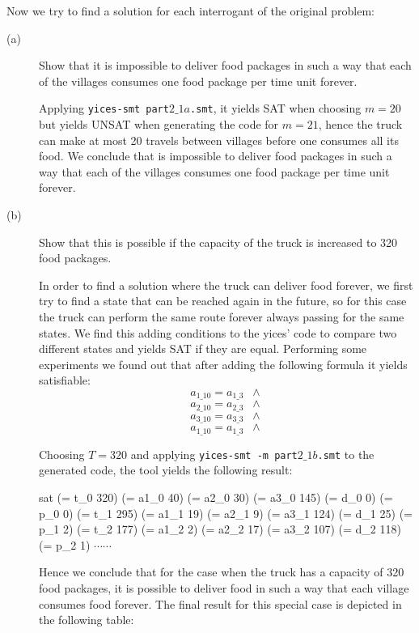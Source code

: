 \documentclass[a4paper]{article}
\begin{document}
Now we try to find a solution for each interrogant of the original problem:
\begin{description}
  \item[(a)] Show that it is impossible to deliver food packages in such a way that each of the villages consumes one food package per time unit forever.

  Applying {\tt yices-smt part$2\_1a$.smt}, it yields SAT when choosing $m=20$ but yields UNSAT when generating the code for $m=21$, hence the truck can make at most 20 travels between villages before one consumes all its food. We conclude that is impossible to deliver food packages in such a way that each of the villages consumes one food package per time unit forever.

  \item[(b)]  Show that this is possible if the capacity of the truck is increased to 320 food packages.

  In order to find a solution where the truck can deliver food forever, we first try to find a state that can be reached again in the future, so for this case the truck can perform the same route forever always passing for the same states. We find this adding conditions to the yices' code to compare two different states and yields SAT if they are equal. Performing some experiments we found out that after adding the following formula it yields satisfiable:
  \[a_{1\_10} = a_{1\_3} \;\;\wedge\]
  \[a_{2\_10} = a_{2\_3} \;\;\wedge\]
  \[a_{3\_10} = a_{3\_3} \;\;\wedge\]
  \[a_{1\_10} = a_{1\_3} \;\;\wedge\]

  Choosing $T = 320$ and applying {\tt yices-smt -m part$2\_1b$.smt} to the generated code, the tool yields the following result:

  \selectfont
  {\footnotesize
  \noindent

sat\break
(= t\_0 320)\break
(= a1\_0 40)\break
(= a2\_0 30)\break
(= a3\_0 145)\break
(= d\_0 0)\break
(= p\_0 0)\break
(= t\_1 295)\break
(= a1\_1 19)\break
(= a2\_1 9)\break
(= a3\_1 124)\break
(= d\_1 25)\break
(= p\_1 2)\break
(= t\_2 177)\break
(= a1\_2 2)\break
(= a2\_2 17)\break
(= a3\_2 107)\break
(= d\_2 118)\break
(= p\_2 1)\break
$\cdots \cdots$
  }
  \selectfont
  \vspace{3mm}

  Hence we conclude that for the case when the truck has a capacity of 320 food packages, it is possible to deliver food in such a way that each village consumes food forever. The final result for this special case is depicted in the following table:



\end{description}
\end{document}

